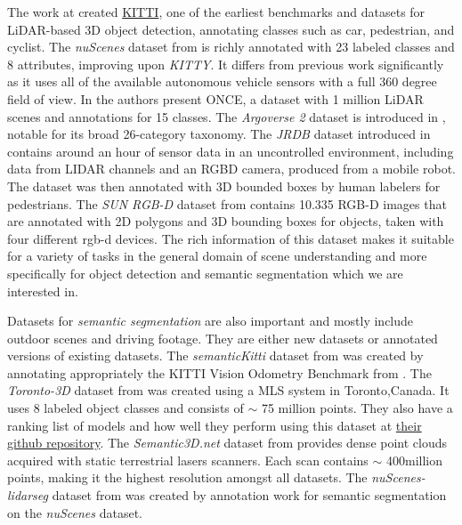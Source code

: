 The work at \cite{geiger_are_2012} created \href{https://www.cvlibs.net/datasets/kitti/eval_object.php?obj_benchmark=3d}{KITTI}, one of the earliest benchmarks and datasets for LiDAR-based 3D object detection, annotating classes such as car, pedestrian, and cyclist.
The \emph{nuScenes} dataset from \cite{Caesar_Bankiti_Lang_Vora_Liong_Xu_Krishnan_Pan_Baldan_Beijbom_2020} is richly annotated with 23 labeled classes and 8 attributes, improving upon \emph{KITTY}. It differs from previous work significantly as it uses all of the available autonomous vehicle sensors with a full 360 degree field of view.
In \cite{mao_one_2021} the authors present ONCE, a dataset with 1 million LiDAR scenes and annotations for 15 classes.
The \emph{Argoverse 2} dataset is introduced in \cite{wilson_argoverse_2023}, notable for its broad 26-category taxonomy.
The \emph{JRDB} dataset introduced in \cite{Martín-Martín_Patel_Rezatofighi_Shenoi_Gwak_Frankel_Sadeghian_Savarese_2023} contains around an hour of sensor data in an uncontrolled environment, including data from LIDAR channels and an RGBD camera, produced from a mobile robot.
The dataset was then annotated with 3D bounded boxes by human labelers for pedestrians.
The \emph{SUN RGB-D} dataset from \cite{Song_Lichtenberg_Xiao_2015} contains 10.335 RGB-D images that are annotated with 2D polygons and 3D bounding boxes for objects, taken with four different rgb-d devices.
The rich information of this dataset makes it suitable for a variety of tasks in the general domain of scene understanding and more specifically for object detection and semantic segmentation which we are interested in.

Datasets for \emph{semantic segmentation} are also important and mostly include outdoor scenes and driving footage. They are either new datasets or annotated versions of existing datasets.
The \emph{semanticKitti} dataset from \cite{Behley_Garbade_Milioto_Quenzel_Behnke_Stachniss_Gall_2019} was created by annotating appropriately the KITTI Vision Odometry Benchmark from \cite{geiger_are_2012}.
The \emph{Toronto-3D} dataset from \cite{Tan_Qin_Ma_Li_Du_Cai_Yang_Li_2020} was created using a \ac{MLS} system in Toronto,Canada. It uses 8 labeled object classes and consists of $\sim$ 75 million points.
They also have a ranking list of models and how well they perform using this dataset at \href{https://github.com/WeikaiTan/Toronto-3D}{their github repository}.
The \emph{Semantic3D.net} dataset from \cite{Hackel_Savinov_Ladicky_Wegner_Schindler_Pollefeys_2017} provides dense point clouds acquired with static terrestrial lasers scanners. Each scan contains $\sim$ 400million points, making it the highest resolution amongst all datasets.
The \emph{nuScenes-lidarseg} dataset from \cite{Fong_Mohan_Hurtado_Zhou_Caesar_Beijbom_Valada_2022} was created by annotation work for semantic segmentation on the \cite{Caesar_Bankiti_Lang_Vora_Liong_Xu_Krishnan_Pan_Baldan_Beijbom_2020} \emph{nuScenes} dataset.

